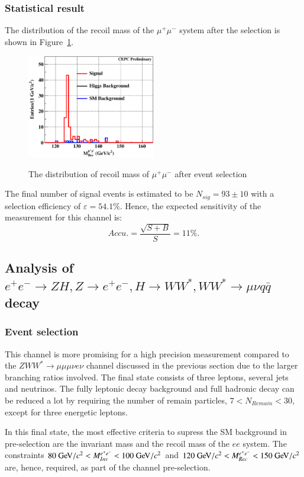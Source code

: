 \documentclass[11pt,a4paper]{cepcnote}
\begin{document}
\subsubsection{Statistical result}
The distribution of the recoil mass of the $\mu^+\mu^-$ system after 
the selection is shown in Figure~\ref{fig:uuhevuvrecfit}.
\begin{figure}[H]
\centering
\includegraphics[width=0.5\textwidth]{e2e2H/evuv/uuh_recfit}
\label{fig:uuhevuvrecfit}
\caption[]{The distribution of recoil mass of $\mu^+\mu^-$ after event selection}
\end{figure}

The final number of signal events is estimated to be $N_{sig} = 93\pm10$ 
with a selection efficiency of $\varepsilon = 54.1\%$. 
Hence, the expected sensitivity of the measurement for this channel is:
\begin{equation*}
Accu.=\frac{\sqrt{S+B}}{S} = 11\%.
\end{equation*}

\subsection{Analysis of $e^+e^-\rightarrow ZH, Z\rightarrow e^+e^-, H\rightarrow WW^*, WW^*\rightarrow \mu\nu q\bar{q}$ decay}
\subsubsection{Event selection}
This channel is more promising for a high precision measurement compared to
the $ZWW^*\to \mu\mu\mu\nu  e\nu$ channel  discussed in the previous section
due to the larger branching ratios involved.
The final state consists of three leptons, several jets and neutrinos.
The fully leptonic decay background {\color{blue} and full hadronic decay} can be reduced a lot
by requiring the number of remain particles, {\color{blue}$7 < N_{Remain} < 30$, except for three energetic leptons}.

In this final state, the most effective criteria to supress the
SM background in  pre-selection are the invariant mass and the recoil mass 
of the $ee$ system. The constraints $80\gev/c^2 < M_{Inv}^{e^+e^-} < 100\gev/c^2$
and $120\gev/c^2 < M_{Rec}^{e^+e^-} < 150\gev/c^2$ are, hence, required, as part
of the channel pre-selection.
\end{document}
